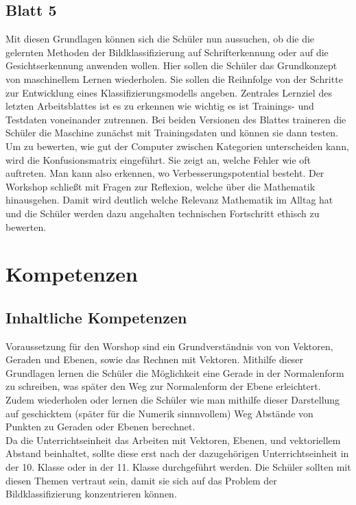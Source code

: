         \subsection{Blatt 5}    
            Mit diesen Grundlagen können sich die Schüler nun aussuchen, ob die die gelernten Methoden der Bildklassifizierung auf Schrifterkennung oder auf die Gesichtserkennung anwenden wollen. Hier sollen die Schüler das Grundkonzept von maschinellem Lernen wiederholen. Sie sollen die Reihnfolge von der Schritte zur Entwicklung eines Klassifizierungsmodells angeben. Zentrales Lernziel des letzten Arbeitsblattes ist es zu erkennen wie wichtig es ist Trainings- und Testdaten voneinander zutrennen. Bei beiden Versionen des Blattes traineren die Schüler die Maschine zunächst mit Trainingsdaten und können sie dann testen.
             Um zu bewerten, wie gut der Computer zwischen Kategorien unterscheiden kann, wird die Konfusionsmatrix eingeführt. Sie zeigt an, welche Fehler wie oft auftreten. Man kann also erkennen, wo Verbesserungspotential besteht. Der Workshop schließt mit Fragen zur Reflexion, welche über die Mathematik hinausgehen. Damit wird deutlich welche Relevanz Mathematik im Alltag hat und die Schüler werden dazu angehalten technischen Fortschritt ethisch zu bewerten.
            
        

    \section{Kompetenzen}
        \subsection{Inhaltliche Kompetenzen}
            Voraussetzung für den Worshop sind ein Grundverständnis von von Vektoren, Geraden und Ebenen, sowie das Rechnen mit Vektoren. 
            Mithilfe dieser Grundlagen lernen die Schüler die Möglichkeit eine Gerade in der Normalenform zu schreiben, was später den Weg zur Normalenform der Ebene erleichtert.
            Zudem wiederholen oder lernen die Schüler wie man mithilfe dieser Darstellung auf geschicktem (später für die Numerik sinnnvollem) Weg Abstände von Punkten zu Geraden oder Ebenen berechnet.  \\

            Da die Unterrichtseinheit das Arbeiten mit Vektoren, Ebenen, und vektoriellem Abstand beinhaltet, sollte diese erst nach der dazugehörigen Unterrichtseinheit in der 10. Klasse oder in der 11. Klasse durchgeführt werden. Die Schüler sollten mit diesen Themen vertraut sein, damit sie sich auf das Problem der Bildklassifizierung konzentrieren können.
